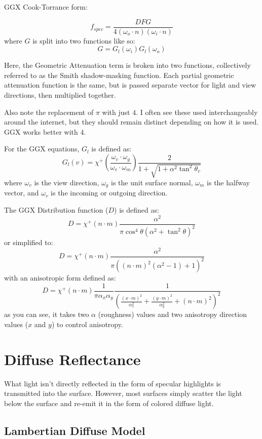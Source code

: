 \documentclass[12pt,letterpaper]{article}
\begin{document}
GGX Cook-Torrance form:

$$
f_{spec} = \frac{D F G}{4 \left( \omega_o \cdot n \right) \left( \omega_i \cdot n \right) }
$$
where $G$ is split into two functions like so:
$$G = G_l(\omega_i) G_l(\omega_o)$$

Here, the Geometric Attenuation term is broken into two functions, collectively referred to as the Smith shadow-masking function. Each partial geometric attenuation function is the same, but is passed separate vector for light and view directions, then multiplied together.

Also note the replacement of $\pi$ with just $4$. I often see these used interchangeably around the internet, but they should remain distinct depending on how it is used. GGX works better with $4$.

For the GGX equations, $G_l$ is defined as:
$$
G_l(v) = \chi^+ \left(\frac{\omega_v \cdot \omega_g}{\omega_v \cdot \omega_m} \right)
\frac{2}{1 + \sqrt{1 + \alpha^2 \tan^2\theta_v}}
$$
where $\omega_v$ is the view direction, $\omega_g$ is the unit surface normal, $\omega_m$ is the halfway vector, and $\omega_v$ is the incoming or outgoing direction.

The GGX Distribution function ($D$) is defined as:
$$
D = \chi^+\left(n \cdot m\right) \frac{\alpha^2}{\pi \cos^4\theta {\left(  \alpha^2 + \tan^2\theta \right)}^2}
$$
or simplified to:
$$
D = \chi^+\left(n \cdot m\right) \frac{\alpha^2}{\pi {\left( {\left( n \cdot m \right)}^2 \left(\alpha^2 - 1\right) + 1 \right)}^2}
$$
with an anisotropic form defined as:
$$
D = \chi^+\left(n \cdot m\right) \frac{1}{\pi \alpha_x \alpha_y} \frac{1}{{\left(
    \frac{{\left( x \cdot m \right)}^2}{\alpha^{2}_{x}} +
    \frac{{\left( y \cdot m \right)}^2}{\alpha^{2}_{y}} +
    {\left( n \cdot m \right)}^2
\right)}^2}
$$
as you can see, it takes two $\alpha$ (roughness) values and two anisotropy direction values ($x$ and $y$) to control anisotropy.

\newpage

\section{Diffuse Reflectance}

What light isn't directly reflected in the form of specular highlights is transmitted into the surface. However, most surfaces simply scatter the light 
below the surface and re-emit it in the form of colored diffuse light.

\subsection{Lambertian Diffuse Model}
\end{document}
